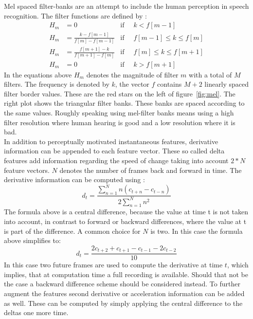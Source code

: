 Mel spaced filter-banks are an attempt to include the human perception in speech recognition. The filter functions are defined by \cite[page 317]{Huang2001}:
\begin{align}
H_m &= 0 									   &\text{if}\;\; & k < f[m-1] \\
H_m &= \frac{k      - f[m-1] }{f[m] - f[m-1]}  &\text{if}\;\; & f[m-1] \leq k \leq f[m] \\
H_m &= \frac{f[m+1] - k      }{f[m + 1] - f[m]}&\text{if}\;\; & f[m] \leq k \leq f[m+1] \\
H_m &= 0									   &\text{if}\;\; & k > f[m+1]
\end{align}
In the equations above $H_m$ denotes the magnitude of filter $m$ with a total of $M$ filters. The frequency is denoted by $k$, the vector $f$ contains $M+2$ linearly spaced filter border values. These are the red stars on the left of  figure~\ref{fig:mel}. The right plot shows the triangular filter banks. These banks are spaced according to the same values. Roughly speaking using mel-filter banks means using a high filter resolution where human hearing is good and a low resolution where it is bad. \\
In addition to perceptually motivated instantaneous features, derivative information can be appended to each feature vector. These so called delta features add information
regarding the speed of change taking into account $2*N$ feature vectors. $N$ denotes the number of frames back and forward in time. The derivative information can be computed using \cite{Woodland2006}:
\begin{equation}
d_t = \frac{\sum\limits_{n=1}^{N} n (c_{t+n}- c_{t-n})}{2 \sum\limits_{n=1}^{N} n^2}
\end{equation}
The formula above is a central difference, because the value at time t is not taken into account, in contrast to forward or backward differences, where the value at t is part of the difference. A common choice for $N$ is two. In this case the formula above simplifies to:
\begin{equation}
d_t = \frac{2c_{t+2} + c_{t+1} - c_{t-1} - 2c_{t-2}}{10}
\end{equation}
In this case two future frames are used to compute the derivative at time $t$, which implies, that at computation time a full recording is available. Should that not be the case a backward difference scheme should be considered instead. To further augment the features second derivative or acceleration information can be added as well. These can be computed by simply applying the central difference to the deltas one more time.

